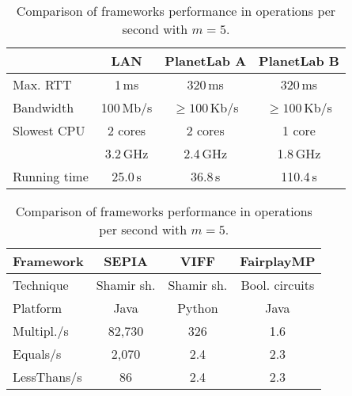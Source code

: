 \documentclass[letterpaper,11pt,onecolumn,titlepage]{article}
\begin{document}
\begin{table}[t]
	\centering
	\begin{minipage}{0.49\textwidth}
		\vspace{0pt}
		\centering
		\begin{small}
		\setlength{\tabcolsep}{3pt}
		\begin{tabular}{p{1.9cm}|ccc}
										 & LAN  	 					& PlanetLab A  					& PlanetLab B \\
			\hline
			Max. RTT 			 & 1\,ms  					&  320\,ms    					& 320\,ms    \\
			Bandwidth		   & 100\,Mb/s  	  	&  $\geq 100$\,Kb/s 	  & $\geq 100$\,Kb/s  \\
			Slowest CPU 	 & 2 cores        	&  2 cores            	& 1 core  	  \\
										 & 3.2\,GHz         &  2.4\,GHz						  & 1.8\,GHz  \\
 		  Running time 	 & 25.0\,s  				&  36.8\,s    					& 110.4\,s   \\
		\end{tabular}
		\end{small}
		\caption{Comparison of LAN and PlanetLab settings.}
		\label{tab:planetlab}
	\end{minipage}
	\hfill
	\begin{minipage}{0.49\textwidth}
		\centering
		\begin{small}
		\setlength{\tabcolsep}{3pt}
		\begin{tabular}{p{1.7cm}|ccc}
			Framework       &  SEPIA         &  VIFF  				& FairplayMP \\
			\hline
			Technique			  &  Shamir sh. & Shamir sh.  & Bool. circuits  \\	      
			Platform				&  Java       & Python      &   Java          \\       
			Multipl./s      &  82,730       &    326    	&    1.6     \\
			Equals/s  	&   2,070 	&     2.4   	&    2.3     \\
			LessThans/s    	&     86   &     2.4       &    2.3     \\
		\end{tabular}
		\end{small}
		\caption{Comparison of frameworks performance in operations per second with $m=5$. }
		\label{tab:frameworks}
	\end{minipage}
\end{table}
\end{document}

